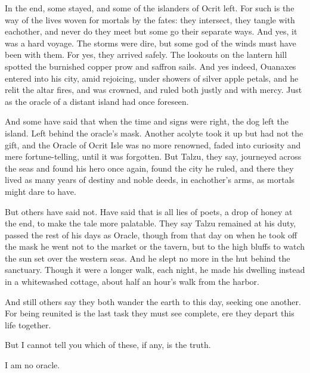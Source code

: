 In the end, some stayed, and some of the islanders of Ocrit left. For such is the way of the lives woven for mortals by the fates: they intersect, they tangle with eachother, and never do they meet but some go their separate ways. And yes, it was a hard voyage. The storms were dire, but some god of the winds must have been with them. For yes, they arrived safely. The lookouts on the lantern hill spotted the burnished copper prow and saffron sails. And yes indeed, Ouanaxes entered into his city, amid rejoicing, under showers of silver apple petals, and he relit the altar fires, and was crowned, and ruled both justly and with mercy. Just as the oracle of a distant island had once foreseen.

\secdiv

\noindent And some have said that when the time and signs were right, the dog left the island. Left behind the oracle's mask. Another acolyte took it up but had not the gift, and the Oracle of Ocrit Isle was no more renowned, faded into curiosity and mere fortune-telling, until it was forgotten. But Talzu, they say, journeyed across the seas and found his hero once again, found the city he ruled, and there they lived as many years of destiny and noble deeds, in eachother's arms, as mortals might dare to have.

But others have said not. Have said that is all lies of poets, a drop of honey at the end, to make the tale more palatable. They say Talzu remained at his duty, passed the rest of his days as Oracle, though from that day on when he took off the mask he went not to the market or the tavern, but to the high bluffs to watch the sun set over the western seas. And he slept no more in the hut behind the sanctuary. Though it were a longer walk, each night, he made his dwelling instead in a whitewashed cottage, about half an hour's walk from the harbor.

And still others say they both wander the earth to this day, seeking one another. For being reunited is the last task they must see complete, ere they depart this life together.

But I cannot tell you which of these, if any, is the truth.

I am no oracle.
